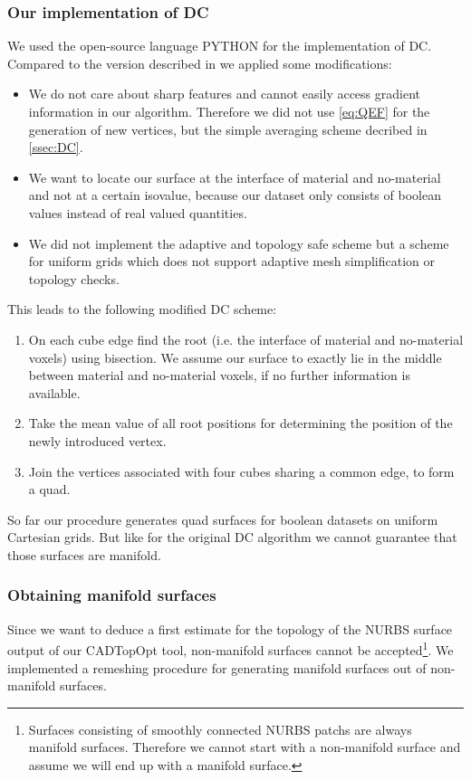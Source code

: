\subsubsection{Our implementation of \ac{DC}}
We used the open-source language PYTHON \cite{Python} for the implementation of \ac{DC}. Compared to the version described in \cite{Hermite2002} we applied some modifications:
\begin{itemize}
\item We do not care about sharp features and cannot easily access gradient information in our algorithm. Therefore we did not use \autoref{eq:QEF} for the generation of new vertices, but the simple averaging scheme decribed in \autoref{ssec:DC}.
\item We want to locate our surface at the interface of material and no-material and not at a certain isovalue, because our dataset only consists of boolean values instead of real valued quantities.
\item We did not implement the adaptive and topology safe scheme but a scheme for uniform grids which does not support adaptive mesh simplification or topology checks.
\end{itemize}
This leads to the following modified \ac{DC} scheme:
\begin{enumerate}
\item On each cube edge find the root (i.e. the interface of material and no-material voxels) using bisection. We assume our surface to exactly lie in the middle between material and no-material voxels, if no further information is available.
\item Take the mean value of all root positions for determining the position of the newly introduced vertex.
\item Join the vertices associated with four cubes sharing a common edge, to form a \ac{quad}.
\end{enumerate}
So far our procedure generates \ac{quad} surfaces for boolean datasets on uniform Cartesian grids. But like for the original \ac{DC} algorithm we cannot guarantee that those surfaces are manifold.

\subsubsection{Obtaining manifold surfaces}
Since we want to deduce a first estimate for the topology of the \ac{NURBS} surface output of our \ac{CADTopOpt} tool, non-manifold surfaces cannot be accepted\footnote{Surfaces consisting of smoothly connected \ac{NURBS} \acp{patch} are always manifold surfaces. Therefore we cannot start with a non-manifold surface and assume we will end up with a manifold surface.}. We implemented a remeshing procedure for generating manifold surfaces out of non-manifold surfaces.

